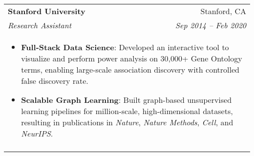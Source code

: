 \documentclass[letterpaper,11pt]{article}
\begin{document}
\begin{tabular*}{0.97\textwidth}[t]{l@{\extracolsep{\fill}}r}
  \textbf{Stanford University} & Stanford, CA \\
  \textit{\small Research Assistant} & \textit{\small Sep 2014 -- Feb 2020} \\
  \multicolumn{2}{l}{
    \begin{minipage}{\textwidth}
      \vspace{0.3em}
      \begin{itemize}[leftmargin=*, itemsep=-4.5pt, topsep=0pt, label={\raisebox{0.4ex}{\tiny\textbullet}}]
        \item \textbf{Full-Stack Data Science}: Developed an interactive tool to visualize and perform power analysis on 30,000+ Gene Ontology terms, enabling large-scale association discovery with controlled false discovery rate.
        \item {\bf Scalable Graph Learning}: Built graph-based unsupervised learning pipelines for million-scale, high-dimensional datasets, resulting in publications in {\it Nature}, {\it Nature Methods}, {\it Cell}, and {\it NeurIPS}.
      \end{itemize}
    \end{minipage}
  } \\
  \noalign{\vspace{0.7em}}

\end{tabular*}

\end{document}
